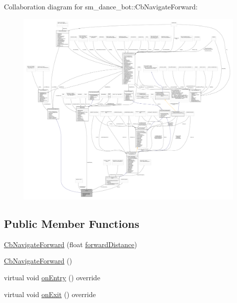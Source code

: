 Collaboration diagram for sm\+\_\+dance\+\_\+bot\+:\+:Cb\+Navigate\+Forward\+:
\nopagebreak
\begin{figure}[H]
\begin{center}
\leavevmode
\includegraphics[width=350pt]{classsm__dance__bot_1_1CbNavigateForward__coll__graph}
\end{center}
\end{figure}
\subsection*{Public Member Functions}
\begin{DoxyCompactItemize}
\item 
\hyperlink{classsm__dance__bot_1_1CbNavigateForward_a36295d9123b7a8d60a97eb75cc21e342}{Cb\+Navigate\+Forward} (float \hyperlink{classsm__dance__bot_1_1CbNavigateForward_a7aa9c05a79d2b0aa0f102ff06f579c07}{forward\+Distance})
\item 
\hyperlink{classsm__dance__bot_1_1CbNavigateForward_a3bc7ae2a24f356af43f43743154425a7}{Cb\+Navigate\+Forward} ()
\item 
virtual void \hyperlink{classsm__dance__bot_1_1CbNavigateForward_a8dd85c804a3d69587d0d6b7a1c4bc6a3}{on\+Entry} () override
\item 
virtual void \hyperlink{classsm__dance__bot_1_1CbNavigateForward_abd291ba77cd42537324eb9fbfc44cd22}{on\+Exit} () override
\end{DoxyCompactItemize}
